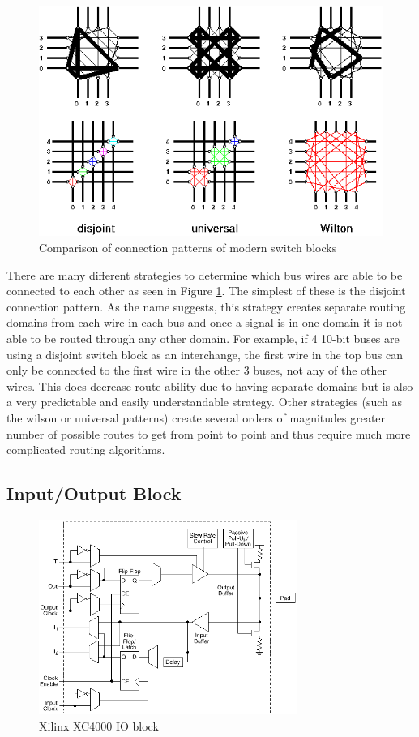 \documentclass[12pt]{article}
\begin{document}
\begin{figure}[ht]
  \centering
  \includegraphics[width=.6\textwidth]{switch_blocks}
  \caption{Comparison of connection patterns of modern switch blocks \cite{switch_blocks}}
  \label{fig:switch_blocks}
\end{figure}

There are many different strategies to determine which bus wires are able to be connected 
to each other as seen in Figure \ref{fig:switch_blocks}. The simplest of these is the disjoint
connection pattern. As the name 
suggests, this strategy creates separate routing domains from each wire in each bus 
and once a signal is in one domain it is not able to be routed through any other 
domain. For example, if 4 10-bit buses are using a disjoint switch block as an interchange,
the first wire in the top bus can only be connected to the first wire in the other 
3 buses, not any of the other wires. This does decrease route-ability due to having 
separate domains but is also a very predictable and easily understandable strategy.
Other strategies (such as the wilson or universal patterns) create several orders 
of magnitudes greater number of possible routes to get from point to point and thus 
require much more complicated routing algorithms.

\subsection{Input/Output Block}

\begin{figure}[ht]
    \centering
    \includegraphics[width=0.75\textwidth]{complex_io}
    \caption{Xilinx XC4000 IO block \cite{xilinx_xc4000}}
    \label{fig:complex_io}
\end{figure}
\end{document}
